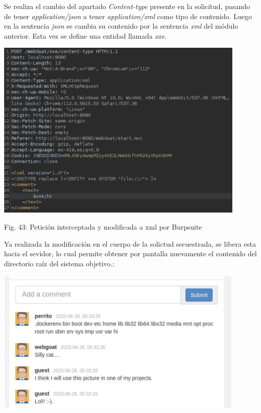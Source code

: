 \documentclass[12pt,oneside,a4paper]{book}
\begin{document}
\begin{enumerate}
\begin{enumerate}
        \newpage

        \hspace{20pt}
        Se realiza el cambio del apartado \textit{Content-type} presente en la solicitud, pasando de tener \textit{application/json} a tener \textit{application/xml} como tipo de contenido. Luego en la sentencia \textit{json} se cambia su contenido por la sentencia \textit{xml} del módulo anterior. Esta vez se define una entidad llamada \textit{xxe}.

        \vspace{2em}

        \begin{center}
            \includegraphics[width=12cm]{img/xxe6.png}
            
            \vspace{0.1em}
            
            Fig. 43: Petición interceptada y modificada a xml por Burpsuite
        \end{center}
        
        \vspace{2em}

        \hspace{20pt}
        Ya realizada la modificación en el cuerpo de la solictud secuestrada, se libera esta hacia el sevidor, lo cual permite obtener por pantalla nuevamente el contenido del directorio raíz del sistema objetivo.:

        \newpage

        \begin{center}
            \includegraphics[width=12cm]{img/xxe7.png}
            

\end{center}
\end{enumerate}
\end{enumerate}
\end{document}
